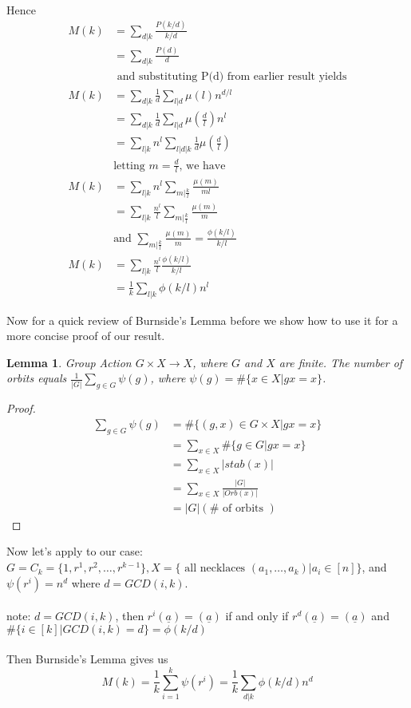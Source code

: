 \documentclass{article}
\begin{document}
\begin{enumerate}
\\
Hence \begin{align*} M(k) &= \sum_{d|k} \frac{P(k/d)}{k/d}\\
&= \sum_{d|k} \frac{P(d)}{d}\\
& \mbox{ and substituting P(d) from earlier result yields}\\
M(k) &= \sum_{d|k}\frac{1}{d} \sum_{l|d}\mu(l)n^{d/l}\\
&= \sum_{d|k}\frac{1}{d}  \sum_{l|d}\mu(\frac{d}{l})n^l\\
&= \sum_{l|k} n^l \sum_{l|d|k}\frac{1}{d}\mu(\frac{d}{l})\\
& \mbox{letting $m = \frac{d}{l}$, we have}\\
M(k) &= \sum_{l|k} n^l \sum_{m|\frac{k}{l}} \frac{\mu(m)}{ml}\\
&= \sum_{l|k} \frac{n^l}{l} \sum_{m|\frac{k}{l}}\frac{\mu(m)}{m}\\
& \mbox{and }\sum_{m|\frac{k}{l}}\frac{\mu(m)}{m} = \frac{\phi (k/l)}{k/l}\\
M(k) &= \sum_{l|k} \frac{n^l}{l} \frac{\phi(k/l)}{k/l}\\
&= \frac{1}{k} \sum_{l|k} \phi(k/l)n^l
\end{align*}

Now for a quick review of Burnside's Lemma before we show how to use it for a more concise proof of our result. \\

\newtheorem*{lem}{Lemma}
\begin{lem} Group Action $G\times X \to X$, where $G$ and $X$ are finite. The number of orbits equals $\frac{1}{|G|}\sum_{g\in G} \psi(g)$, where $\psi(g) = \#\{x\in X|gx=x\}$. \end{lem}

\begin{proof}
\begin{align*}
\sum_{g\in G} \psi(g) &= \#\{(g,x) \in G \times X | gx =x\}\\
&= \sum_{x\in X} \#\{g\in G| gx=x\}\\
&= \sum_{x\in X}|stab(x)|\\
&= \sum_{x\in X} \frac{|G|}{|Orb(x)|}\\
&= |G|(\# \mbox{ of orbits })
\end{align*}
\end{proof}

Now let's apply to our case: $G = C_k = \{1,r^1,r^2,\dots, r^{k-1}\}, X = \{\mbox{ all necklaces }(a_1,\dots, a_k)| a_i \in [n]\}$, and $\psi(r^i) = n^d$ where $d = GCD(i,k)$. \\
\\
{\small \noindent *note: $d = GCD(i,k)$, then $r^i(\underline{a}) = (\underline{a})$ if and only if $r^d(\underline{a}) = (\underline{a})$ and $\#\{ i \in [k]|GCD(i,k) = d\} = \phi(k/d)$}
\\
\\
\noindent Then Burnside's Lemma gives us
$$ M(k) = \frac{1}{k} \sum_{i=1}^k \psi(r^i) = \frac{1}{k}\sum_{d|k}\phi(k/d)n^d$$ 



\end{enumerate}
\end{document}
